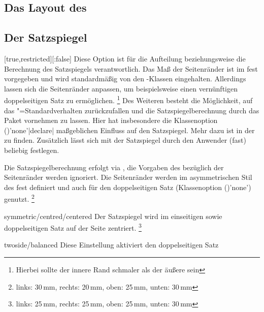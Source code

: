 \begin{Declaration*}{}
\begin{Declaration*}{}
\begin{Declaration*}{}
\section{Das Layout des \CDs}
%
\subsection{Der Satzspiegel}
%
%
\begin{Declaration}[%
  v2.03;
  v2.05!\Option{cdgeometry=restricted};%
  v2.05!\Option{cdgeometry=adapted};%
  v2.05!\Option{cdgeometry=calculated};%
  v2.05!\Option{cdgeometry=custom};%
]{}[true,restricted][:false]%
\printdeclarationlist%
%
%
%
Diese Option ist für die Aufteilung beziehungsweise die Berechnung des 
Satzspiegels verantwortlich. Das Maß der Seitenränder ist im \CD fest 
vorgegeben und wird standardmäßig von den \TUDScript-Klassen eingehalten. 
Allerdings lassen sich die Seitenränder anpassen, um beispielsweise einen 
vernünftigen doppelseitigen Satz zu ermöglichen.%
\footnote{Hierbei sollte der innere Rand schmaler als der äußere sein}
Des Weiteren besteht die Möglichkeit, auf das \KOMAScript"=Standardverhalten 
zurückzufallen und die Satzspiegelberechnung durch das Paket  
vornehmen zu lassen. Hier hat insbesondere die Klassenoption 
()'none'|declare| maßgeblichen Einfluss auf 
den Satzspiegel. Mehr dazu ist in der  
zu finden.
Zusätzlich lässt sich mit  der Satzspiegel durch den 
Anwender (fast) beliebig festlegen.
%
\begin{values}{}
\itemfalse
  Die Satzspiegelberechnung erfolgt via , die Vorgaben des 
  \CDs bezüglich der Seitenränder werden ignoriert.
\itemtrue*[asymmetric/cd]
  Die Seitenränder werden im asymmetrischen Stil des \CDs fest definiert und 
  auch für den doppelseitigen Satz
  (Klassenoption ()'none') genutzt.%
  \footnote{links: 30\,mm, rechts: 20\,mm, oben: 25\,mm, unten: 30\,mm}
\item[symmetric/centred/centered]
  Der Satzspiegel wird im einseitigen sowie doppelseitigen Satz auf der Seite 
  zentriert.%
  \footnote{links: 25\,mm, rechts: 25\,mm, oben: 25\,mm, unten: 30\,mm}
\item[twoside/balanced]
  Diese Einstellung aktiviert den doppelseitigen Satz 

\end{values}
\end{Declaration}
\end{Declaration*}
\end{Declaration*}
\end{Declaration*}
